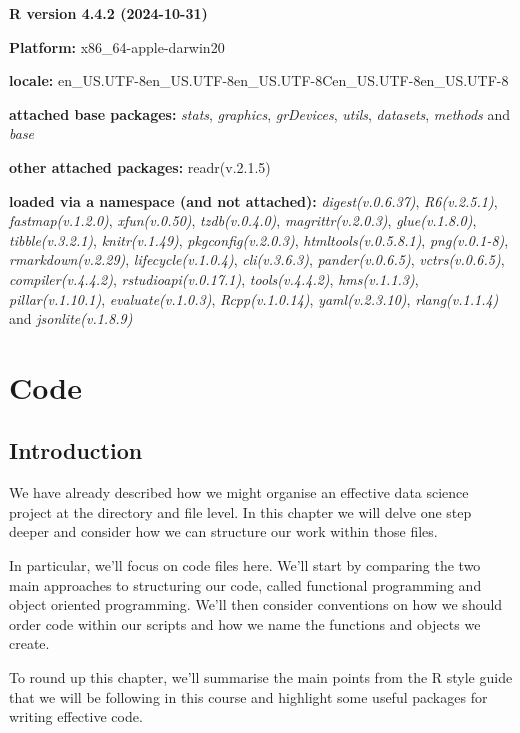 \documentclass[
  letterpaper,
  DIV=11,
  numbers=noendperiod]{scrreprt}
\begin{document}
\textbf{R version 4.4.2 (2024-10-31)}

\textbf{Platform:} x86\_64-apple-darwin20

\textbf{locale:}
en\_US.UTF-8\textbar\textbar en\_US.UTF-8\textbar\textbar en\_US.UTF-8\textbar\textbar C\textbar\textbar en\_US.UTF-8\textbar\textbar en\_US.UTF-8

\textbf{attached base packages:} \emph{stats}, \emph{graphics},
\emph{grDevices}, \emph{utils}, \emph{datasets}, \emph{methods} and
\emph{base}

\textbf{other attached packages:} readr(v.2.1.5)

\textbf{loaded via a namespace (and not attached):}
\emph{digest(v.0.6.37)}, \emph{R6(v.2.5.1)}, \emph{fastmap(v.1.2.0)},
\emph{xfun(v.0.50)}, \emph{tzdb(v.0.4.0)}, \emph{magrittr(v.2.0.3)},
\emph{glue(v.1.8.0)}, \emph{tibble(v.3.2.1)}, \emph{knitr(v.1.49)},
\emph{pkgconfig(v.2.0.3)}, \emph{htmltools(v.0.5.8.1)},
\emph{png(v.0.1-8)}, \emph{rmarkdown(v.2.29)},
\emph{lifecycle(v.1.0.4)}, \emph{cli(v.3.6.3)}, \emph{pander(v.0.6.5)},
\emph{vctrs(v.0.6.5)}, \emph{compiler(v.4.4.2)},
\emph{rstudioapi(v.0.17.1)}, \emph{tools(v.4.4.2)}, \emph{hms(v.1.1.3)},
\emph{pillar(v.1.10.1)}, \emph{evaluate(v.1.0.3)},
\emph{Rcpp(v.1.0.14)}, \emph{yaml(v.2.3.10)}, \emph{rlang(v.1.1.4)} and
\emph{jsonlite(v.1.8.9)}

\chapter{Code}\label{workflows-code}

\section{Introduction}\label{introduction-2}

We have already described how we might organise an effective data
science project at the directory and file level. In this chapter we will
delve one step deeper and consider how we can structure our work within
those files.

In particular, we'll focus on code files here. We'll start by comparing
the two main approaches to structuring our code, called functional
programming and object oriented programming. We'll then consider
conventions on how we should order code within our scripts and how we
name the functions and objects we create.

To round up this chapter, we'll summarise the main points from the R
style guide that we will be following in this course and highlight some
useful packages for writing effective code.
\end{document}
